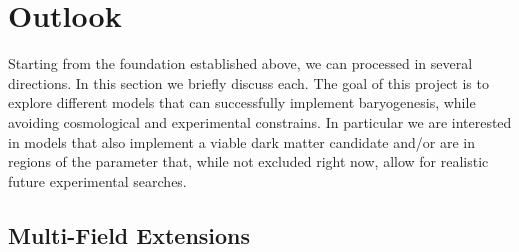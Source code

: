 \documentclass[13pt,a4paper,twoside,titlepage]{article}
\begin{document}

\section{Outlook}
\label{sec:outlook}

Starting from the foundation established above, we can processed in several directions.
In this section we briefly discuss each. The goal of this project is to explore
different models that can successfully implement baryogenesis, while avoiding cosmological and
experimental constrains.
In particular we are interested in models that also implement a viable dark matter candidate
and/or are in regions of the parameter that, while not excluded right now, allow for realistic future experimental searches.

\subsection{Multi-Field Extensions}
\label{sec:multi_fields}
\end{document}
